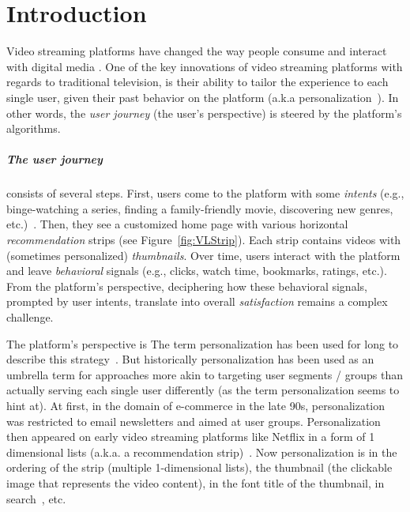 
\chapter{Introduction}
\label{chapter:introduction}


Video streaming platforms have changed the way people consume and interact with digital media \cite{NetflixReco}. One of the key innovations of video streaming platforms with regards to traditional television, is their ability to tailor the experience to each single user, given their past behavior on the platform (a.k.a personalization~\cite{oldPersonalizationBehavior, oldPersonalizationSearch}). In other words, the \emph{user journey} (the user's perspective) is steered by the platform's algorithms.

\paragraph{The user journey} consists of several steps. First, users come to the platform with some \emph{intents} (e.g., binge-watching a series, finding a family-friendly movie, discovering new genres, etc.)~\cite{intent}. Then, they see a customized home page with various horizontal \emph{recommendation} strips (see Figure~\ref{fig:VLStrip}). Each strip contains videos with (sometimes personalized) \emph{thumbnails}. Over time, users interact with the platform and leave \emph{behavioral} signals (e.g., clicks, watch time, bookmarks, ratings, etc.). From the platform's perspective, deciphering how these behavioral signals, prompted by user intents, translate into overall \emph{satisfaction} remains a complex challenge.  

The platform's perspective is The term personalization has been used for long to describe this strategy~\cite{oldPersonalizationBehavior, oldPersonalizationSearch}. But historically personalization has been used as an umbrella term for approaches more akin to targeting user segments / groups than actually serving each single user differently (as the term personalization seems to hint at). At first, in the domain of e-commerce in the late 90s, personalization was restricted to email newsletters and aimed at user groups. Personalization then appeared on early video streaming platforms like Netflix in a form of 1 dimensional lists (a.k.a. a recommendation strip)~\cite{oldReco}. Now personalization is in the ordering of the strip (multiple 1-dimensional lists), the thumbnail (the clickable image that represents the video content), in the font title of the thumbnail, in search~\cite{NetflixReco}, etc.


